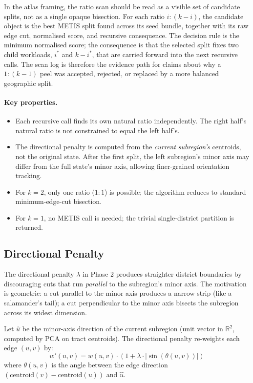 In the atlas framing, the ratio scan should be read as a visible set of
candidate splits, not as a single opaque bisection.
For each ratio $i:(k-i)$, the candidate object is the best METIS split found
across its seed bundle, together with its raw edge cut, normalised score, and
recursive consequence.
The decision rule is the minimum normalised score; the consequence is that the
selected split fixes two child workloads, $i^*$ and $k-i^*$, that are carried
forward into the next recursive calls.
The scan log is therefore the evidence path for claims about why a $1:(k-1)$
peel was accepted, rejected, or replaced by a more balanced geographic split.

\paragraph{Key properties.}
\begin{itemize}
\item Each recursive call finds its own natural ratio independently.
  The right half's natural ratio is not constrained to equal the left half's.
\item The directional penalty is computed from the \emph{current subregion's}
  centroids, not the original state.
  After the first split, the left subregion's minor axis may differ from the
  full state's minor axis, allowing finer-grained orientation tracking.
\item For $k=2$, only one ratio ($1:1$) is possible; the algorithm reduces
  to standard minimum-edge-cut bisection.
\item For $k=1$, no METIS call is needed; the trivial single-district
  partition is returned.
\end{itemize}

\subsection{Directional Penalty}
\label{sec:phase2}

The directional penalty $\lambda$ in Phase 2 produces straighter district
boundaries by discouraging cuts that run \emph{parallel} to the subregion's
minor axis.
The motivation is geometric: a cut parallel to the minor axis produces a
narrow strip (like a salamander's tail); a cut perpendicular to the minor
axis bisects the subregion across its widest dimension.

\begin{definition}
Let $\hat{u}$ be the minor-axis direction of the current subregion
(unit vector in $\mathbb{R}^2$, computed by PCA on tract centroids).
The directional penalty re-weights each edge $(u,v)$ by:
\[
  w'(u,v) = w(u,v) \cdot (1 + \lambda \cdot |\!\sin(\theta(u,v))|)
\]
where $\theta(u,v)$ is the angle between the edge direction
$(\mathrm{centroid}(v) - \mathrm{centroid}(u))$ and $\hat{u}$.
\end{definition}

